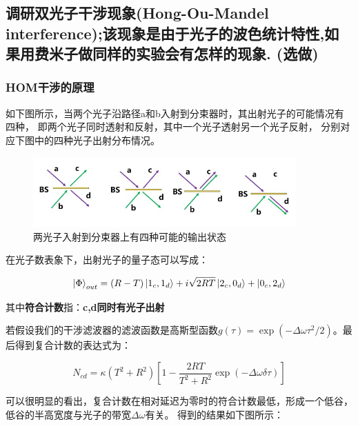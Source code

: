 \documentclass[a4paper,UTF8]{ctexart}
\begin{document}
\subsection{调研双光子干涉现象(Hong-Ou-Mandel  interference);该现象是由于光子的波色统计特性,如果用费米子做同样的实验会有怎样的现象. (选做)}

\subsubsection{HOM干涉的原理}

如下图所示，当两个光子沿路径a和b入射到分束器时，其出射光子的可能情况有四种，
即两个光子同时透射和反射，其中一个光子透射另一个光子反射，
分别对应下图中的四种光子出射分布情况。

\begin{figure}[H]
    \centering
    \begin{minipage}[b]{0.9\textwidth}
        \centering
        \includegraphics[width=0.9\textwidth]{./fig22.jpg}
        \caption{两光子入射到分束器上有四种可能的输出状态}
    \end{minipage}
\end{figure}

在光子数表象下，出射光子的量子态可以写成：

\begin{equation}
    \ket{\Phi}_{out} = (R-T) \ket{1_c,1_d} + i\sqrt{2RT}\ket{2_c,0_d} + \ket{0_c,2_d}
\end{equation}

其中{\bfseries{符合计数}}指：{\bfseries{c,d同时有光子出射}}

若假设我们的干涉滤波器的滤波函数是高斯型函数$g(\tau) = \exp{(-\Delta \omega \tau^2 /2)}$。最后得到复合计数的表达式为：

\begin{equation}
    N_{cd} = \kappa (T^2+R^2)[1-\frac{2RT}{T^2+R^2}\exp{(-\Delta \omega \delta \tau)}]
\end{equation}

可以很明显的看出，复合计数在相对延迟为零时的符合计数最低，形成一个低谷，低谷的半高宽度与光子的带宽$\Delta \omega$有关。
得到的结果如下图所示：
\end{document}
